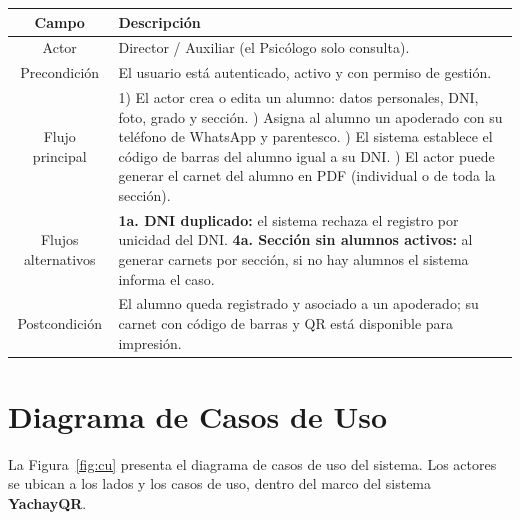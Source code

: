 \documentclass[a4paper,12pt]{article}
\begin{document}
\begin{table}[H]
\centering
\begin{tabularx}{\linewidth}{C X}
\toprule
\textbf{Campo} & \textbf{Descripción} \\
\midrule
Actor & Director / Auxiliar (el Psicólogo solo consulta). \\
\addlinespace
Precondición & El usuario está autenticado, activo y con permiso de gestión. \\
\addlinespace
Flujo principal &
  1) El actor crea o edita un alumno: datos personales, DNI, foto, grado y
     sección. ) Asigna al alumno un apoderado con su teléfono de WhatsApp y parentesco.
     ) El sistema establece el código de barras del alumno igual a su DNI.
     ) El actor puede generar el carnet del alumno en PDF (individual o de toda
     la sección). \\
\addlinespace
Flujos alternativos &
  \textbf{1a. DNI duplicado:} el sistema rechaza el registro por unicidad del
  DNI. \newline
  \textbf{4a. Sección sin alumnos activos:} al generar carnets por sección, si
  no hay alumnos el sistema informa el caso. \\
\addlinespace
Postcondición &
  El alumno queda registrado y asociado a un apoderado; su carnet con código de
  barras y QR está disponible para impresión. \\
\bottomrule
\end{tabularx}
\end{table}

\section{Diagrama de Casos de Uso}

La Figura~\ref{fig:cu} presenta el diagrama de casos de uso del sistema. Los
actores se ubican a los lados y los casos de uso, dentro del marco del sistema
\textbf{YachayQR}.
\end{document}
